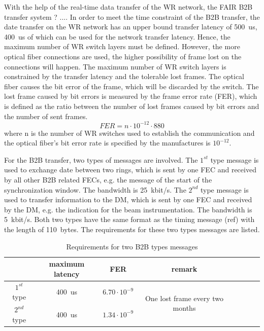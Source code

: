 With the help of the real-time data transfer of the WR network, the FAIR B2B transfer system ? ....
In order to meet the time constraint of the B2B transfer, the date transfer on the WR network has an upper bound transfer latency of \SI{500}{us}, \SI{400}{us} of which can be used for the network transfer latency. Hence, the maximum number of WR switch layers must be defined. However, the more optical fiber connections are used, the higher possibility of frame lost on the connections will happen. The maximum number of WR switch layers is constrained by the transfer latency and the tolerable lost frames. The optical fiber causes the bit error of the frame, which will be discarded by the switch. The lost frame caused by bit errors is measured by the frame error rate (FER), which is defined as the ratio between the number of lost frames caused by bit errors and the number of sent frames. 
\begin{equation}
\label{FER}
	FER=n\cdot10^{-12}\cdot880
\end{equation}
where n is the number of WR switches used to establish the communication and the optical fiber's bit error rate is specified by the manufactures is $10^{-12}$.  

For the B2B transfer, two types of messages are involved. The $1^\mathit{st}$ type message is used to exchange date between two rings, which is sent by one FEC and received by all other B2B related FECs, e.g. the message of the start of the synchronization window. The bandwidth is \SI{25}{kbit/s}. The $2^\mathit{nd}$ type message is used to transfer information to the DM, which is sent by one FEC and received by the DM, e.g. the indication for the beam instrumentation. The bandwidth is \SI{5}{kbit/s}. Both two types have the same format as the timing message (ref) with the length of \SI{110}{bytes}. The requirements for these two types messages are listed.

\begin{table}[!htb]
\newcommand{\tabincell}[2]{\begin{tabular}{@{}#1@{}}#2\end{tabular}}
\caption{Requirements for two B2B types messages}
\label{dynamic_param}
\begin{center}
    \begin{tabular}{ | c |c | c | c | c | c | c | c |}
    \hline
    							& maximum latency & FER & remark  \\ \hline
       $1^\mathit{st}$ type	&  \SI{400}{us}  & $6.70\cdot 10^{-9}$ & \multirow{2}{*}{\parbox{3cm}{One lost frame every two months}} \\ \cline{1-3}
       $2^\mathit{nd}$ type	&  \SI{400}{us}  & $1.34\cdot 10^{-9}$ &  \\ \hline
    \end{tabular}
\end{center}
\end{table}

